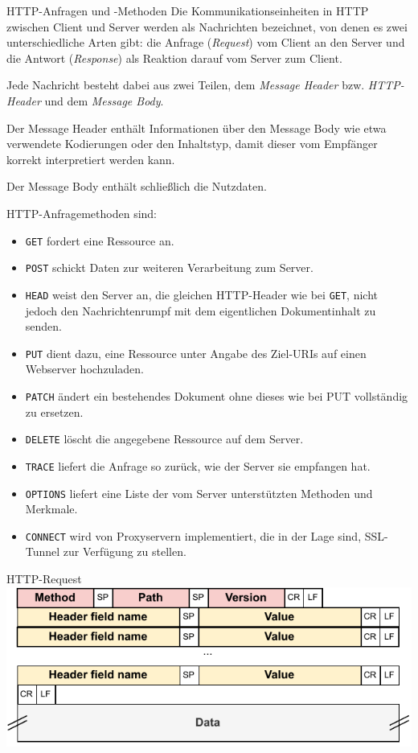 \begin{defi}{HTTP-Anfragen und -Methoden}
    Die Kommunikationseinheiten in HTTP zwischen Client und Server werden als Nachrichten bezeichnet, von denen es zwei unterschiedliche Arten gibt: die Anfrage (\emph{Request}) vom Client an den Server und die Antwort (\emph{Response}) als Reaktion darauf vom Server zum Client.

    Jede Nachricht besteht dabei aus zwei Teilen, dem \emph{Message Header} bzw. \emph{HTTP-Header} und dem \emph{Message Body}.

    Der Message Header enthält Informationen über den Message Body wie etwa verwendete Kodierungen oder den Inhaltstyp, damit dieser vom Empfänger korrekt interpretiert werden kann.

    Der Message Body enthält schließlich die Nutzdaten.

    HTTP-Anfragemethoden sind:
    \begin{itemize}
        \item \texttt{GET} fordert eine Ressource an.
        \item \texttt{POST} schickt Daten zur weiteren Verarbeitung zum Server.
        \item \texttt{HEAD} weist den Server an, die gleichen HTTP-Header wie bei \texttt{GET}, nicht jedoch den Nachrichtenrumpf mit dem eigentlichen Dokumentinhalt zu senden.
        \item \texttt{PUT} dient dazu, eine Ressource unter Angabe des Ziel-URIs auf einen Webserver hochzuladen.
        \item \texttt{PATCH} ändert ein bestehendes Dokument ohne dieses wie bei PUT vollständig zu ersetzen.
        \item \texttt{DELETE} löscht die angegebene Ressource auf dem Server.
        \item \texttt{TRACE} liefert die Anfrage so zurück, wie der Server sie empfangen hat.
        \item \texttt{OPTIONS} liefert eine Liste der vom Server unterstützten Methoden und Merkmale.
        \item \texttt{CONNECT} wird von Proxyservern implementiert, die in der Lage sind, SSL-Tunnel zur Verfügung zu stellen.
    \end{itemize}
\end{defi}

\begin{defi}{HTTP-Request}
    \centering
    \includegraphics[width=.7\textwidth]{includes/figures/defi_http_request_header.pdf}
\end{defi}


